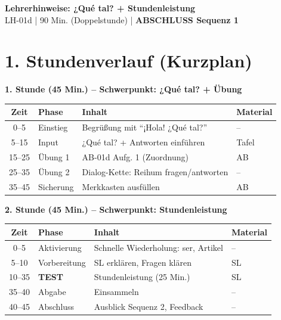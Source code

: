\documentclass[11pt, a4paper]{article}
\newcommand{\fachfarbe}{spanisch}
\newcommand{\thema}{¿Qué tal? + Stundenleistung}
\newcommand{\sequenz}{01}
\newcommand{\block}{d}
\newcommand{\dauer}{90 Min. (Doppelstunde)}
\begin{document}
\begin{center}
    {\Large\bfseries\textcolor{\fachfarbe}{Lehrerhinweise: \thema}}\\[0.3em]
    {\normalsize LH-\sequenz\block{} | \dauer{} | \textbf{ABSCHLUSS Sequenz 1}}
\end{center}

\vspace{10pt}

\section*{1. Stundenverlauf (Kurzplan)}

\textbf{1. Stunde (45 Min.) -- Schwerpunkt: ¿Qué tal? + Übung}

\begin{tabularx}{\textwidth}{|c|l|X|l|}
\hline
\textbf{Zeit} & \textbf{Phase} & \textbf{Inhalt} & \textbf{Material} \\
\hline
0--5 & Einstieg & Begrüßung mit ``¡Hola! ¿Qué tal?'' & -- \\
\hline
5--15 & Input & ¿Qué tal? + Antworten einführen & Tafel \\
\hline
15--25 & Übung 1 & AB-01d Aufg. 1 (Zuordnung) & AB \\
\hline
25--35 & Übung 2 & Dialog-Kette: Reihum fragen/antworten & -- \\
\hline
35--45 & Sicherung & Merkkasten ausfüllen & AB \\
\hline
\end{tabularx}

\vspace{1em}

\textbf{2. Stunde (45 Min.) -- Schwerpunkt: Stundenleistung}

\begin{tabularx}{\textwidth}{|c|l|X|l|}
\hline
\textbf{Zeit} & \textbf{Phase} & \textbf{Inhalt} & \textbf{Material} \\
\hline
0--5 & Aktivierung & Schnelle Wiederholung: ser, Artikel & -- \\
\hline
5--10 & Vorbereitung & SL erklären, Fragen klären & SL \\
\hline
10--35 & \textbf{TEST} & Stundenleistung (25 Min.) & SL \\
\hline
35--40 & Abgabe & Einsammeln & -- \\
\hline
40--45 & Abschluss & Ausblick Sequenz 2, Feedback & -- \\
\hline
\end{tabularx}
\end{document}
